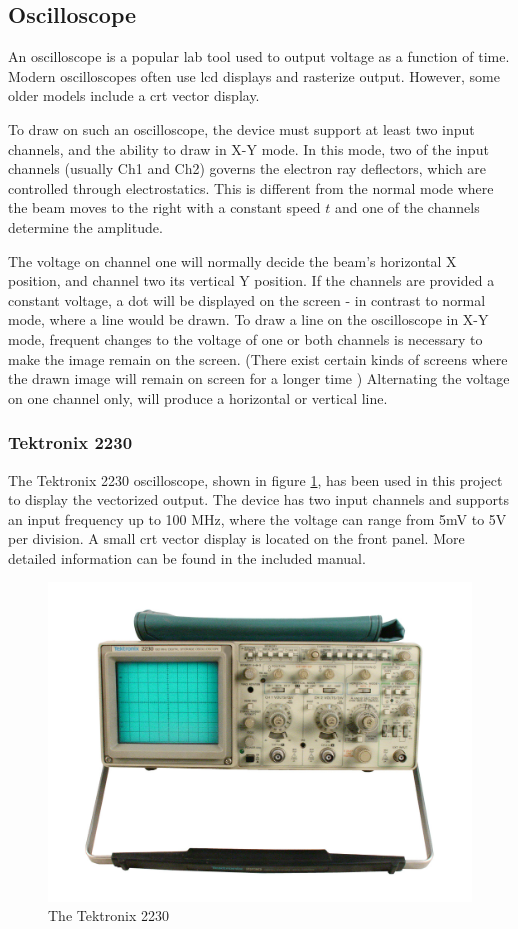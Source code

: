 \subsection{Oscilloscope}
An oscilloscope is a popular lab tool used to output voltage as a function of time.
Modern oscilloscopes often use \gls{lcd} displays and rasterize output. 
However, some older models include a \gls{crt} vector display.

To draw on such an oscilloscope, the device must support at least two input channels, and the ability to draw in X-Y mode.
In this mode, two of the input channels (usually Ch1 and Ch2) governs the electron ray deflectors, which are controlled through electrostatics. 
This is different from the normal mode where the beam moves to the right with a constant speed \( t \) and one of the channels determine the amplitude.

The voltage on channel one will normally decide the beam's horizontal X position, and channel two its vertical Y position.
If the channels are provided a constant voltage, a dot will be displayed on the screen - in contrast to normal mode, where a line would be drawn.
To draw a line on the oscilloscope in X-Y mode, frequent changes to the voltage of one or both channels is necessary to make the image remain on the screen. (There exist certain kinds of screens where the drawn image will remain on screen for a longer time \citep{tektronix4010})
Alternating the voltage on one channel only, will produce a horizontal or vertical line.

\subsubsection{Tektronix 2230}
The Tektronix 2230 oscilloscope, shown in figure \ref{fig:oscilloscope}, has been used in this project to display the vectorized output.
The device has two input channels and supports an input frequency up to 100 MHz, where the voltage can range from 5mV to 5V per division.
A small \gls{crt} vector display is located on the front panel.
More detailed information can be found in the included manual\cite{tektronix2230}.

\begin{figure}[h!]
	\centering
	\includegraphics[width=0.6\linewidth]{images/oscilloscope.jpg}
    \caption{The Tektronix 2230\cite{oscilloscope}}
    \label{fig:oscilloscope}
\end{figure}


